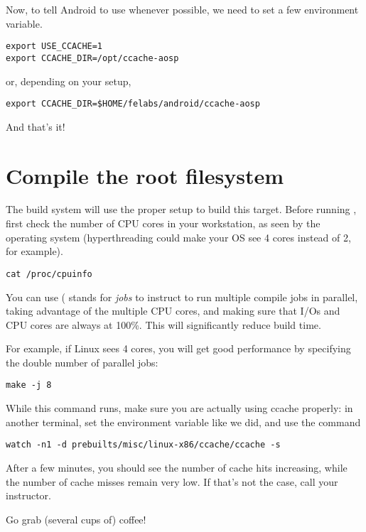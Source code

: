 Now, to tell Android to use  whenever possible, we need
to set a few environment variable.

\begin{verbatim}
export USE_CCACHE=1
export CCACHE_DIR=/opt/ccache-aosp
\end{verbatim}
or, depending on your setup,
\begin{verbatim}
export CCACHE_DIR=$HOME/felabs/android/ccache-aosp
\end{verbatim}

And that's it!

\section{Compile the root filesystem}

The build system will use the proper setup to build this
target. Before running , first check the number of CPU
cores in your workstation, as seen by the operating system
(hyperthreading could make your OS see 4 cores instead of 2, for
example).

\begin{verbatim}
cat /proc/cpuinfo
\end{verbatim}

You can use  ( stands for {\it jobs} to instruct
 to run multiple compile jobs in parallel, taking advantage
of the multiple CPU cores, and making sure that I/Os and CPU cores are
always at 100\%. This will significantly reduce build time.

For example, if Linux sees 4 cores, you will get good performance by
specifying the double number of parallel jobs:

\begin{verbatim}
make -j 8
\end{verbatim}

While this command runs, make sure you are actually using ccache
properly: in another terminal, set the  environment
variable like we did, and use the command

\begin{verbatim}
watch -n1 -d prebuilts/misc/linux-x86/ccache/ccache -s
\end{verbatim}

After a few minutes, you should see the number of cache hits
increasing, while the number of cache misses remain very low. If
that's not the case, call your instructor.

Go grab (several cups of) coffee!


